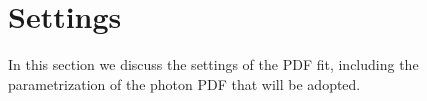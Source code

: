 \section{Settings}
\label{sec:fitsettings}

In this section we discuss the settings of
the PDF fit, including the parametrization of the photon PDF
that will be adopted.
